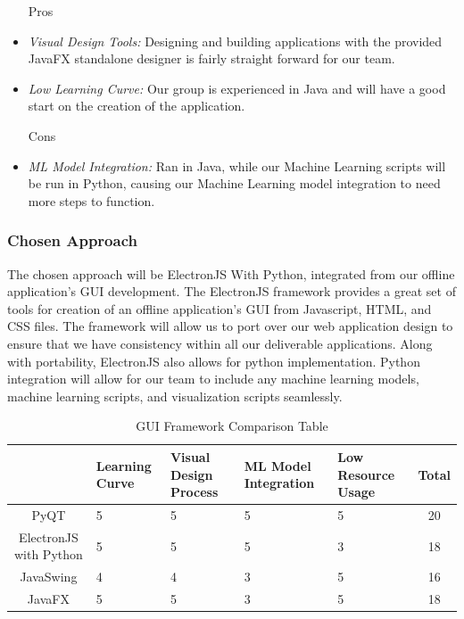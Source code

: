 \documentclass[12pt,journal,compsoc]{IEEEtran}
\newenvironment{subs}
  {\adjustwidth{1em}{0pt}}
  {\endadjustwidth}
\begin{document}
\begin{subs}
\begin{subs}
\begin{subs}
\begin{subs}
\begin{itemize}
    \item [{Pros}]
    \item \emph{Visual Design Tools:} Designing and building applications with the provided JavaFX standalone designer is fairly straight forward for our team.
    \item \emph{Low Learning Curve:} Our group is experienced in Java and will have a good start on the creation of the application.
    \item [{Cons}]
    \item \emph{ML Model Integration:} Ran in Java, while our Machine Learning scripts will be run in Python, causing our Machine Learning model integration to need more steps to function.
\end{itemize}
\end{subs}
\end{subs}

\subsubsection{Chosen Approach}
The chosen approach will be ElectronJS With Python, integrated from our offline application's GUI development. The ElectronJS framework provides a great set of tools for creation of an offline application's GUI from Javascript, HTML, and CSS files. The framework will allow us to port over our web application design to ensure that we have consistency within all our deliverable applications. Along with portability, ElectronJS also allows for python implementation. Python integration will allow for our team to include any machine learning models, machine learning scripts, and visualization scripts seamlessly. 

\begin{table}[H]
\renewcommand{\arraystretch}{1.3}
\caption{GUI Framework Comparison Table}
\label{table_3}
\centering
\begin{tabular}{|c||m{8em}|m{8em}|m{8em}|m{8em}||c|}
\hline
&
Learning Curve
&
Visual Design Process
&
ML Model Integration
&
Low Resource Usage
&
Total\\
\hline
\hline
PyQT & 5 & 5 & 5 & 5 & 20\\
\hline
ElectronJS with Python & 5 & 5 & 5 & 3 & 18\\
\hline
JavaSwing & 4 & 4 & 3 & 5 & 16\\
\hline
JavaFX & 5 & 5 & 3 & 5 & 18\\
\hline
\end{tabular}
\end{table}


\end{subs}
\end{subs}
\end{document}
